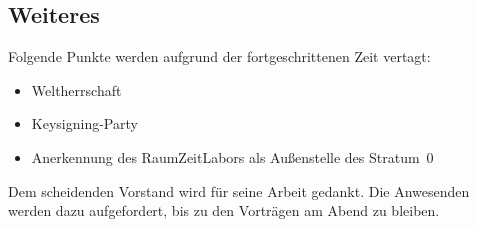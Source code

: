 \documentclass{s0minutes}
\begin{document}
\subsection{Weiteres}

Folgende Punkte werden aufgrund der fortgeschrittenen Zeit vertagt:
\begin{itemize}
  \item Weltherrschaft
  \item Keysigning-Party
  \item Anerkennung des RaumZeitLabors als Außenstelle des Stratum~0
\end{itemize}

Dem scheidenden Vorstand wird für seine Arbeit gedankt. Die Anwesenden werden
dazu aufgefordert, bis zu den Vorträgen am Abend zu bleiben.
\end{document}
